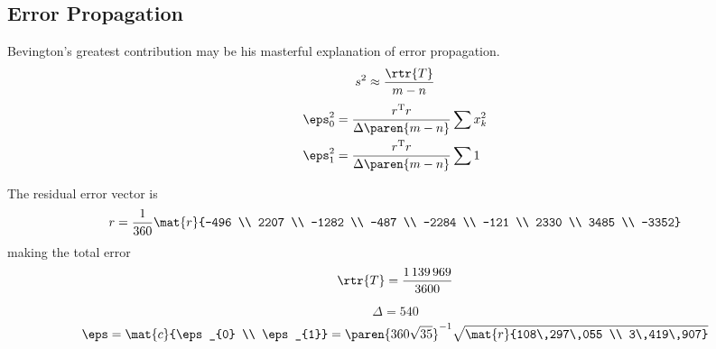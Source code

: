 \subsection{Error Propagation}  %

Bevington's greatest contribution may be his masterful explanation of error propagation.
  \begin{equation*}
    s^{2} \approx \frac{\rtr{T}} {m-n}
  \end{equation*}
\begin{equation*}
  \begin{split}
    \eps_{0}^{2} &= \frac{r^{\mathrm{T}}r}{\Delta\paren{m-n}} \sum x_{k}^{2} \\
    \eps_{1}^{2} &= \frac{r^{\mathrm{T}}r}{\Delta\paren{m-n}} \sum 1 \\
  \end{split}
  \label{eqn:bevington error terms}
\end{equation*}

The residual error vector is
  \begin{equation*}
      r = \frac{1}{360}
          \mat{r}{-496 \\ 2207 \\ -1282 \\ -487 \\ -2284 \\ -121 \\ 2330 \\ 3485 \\ -3352}
  \end{equation*}
making the total error
  \begin{equation*}
      \rtr{T} = \frac{1\,139\,969}{3600}
  \end{equation*}

  \begin{equation*}   %
    \Delta = 540
  \end{equation*}
  \begin{equation*}   %
    \eps = \mat{c}{\eps_{0} \\ \eps_{1}} = 
    \paren{360\sqrt{35}}^{-1}
    \sqrt{ \mat{r}{108\,297\,055 \\ 3\,419\,907} }
  \end{equation*}
  

